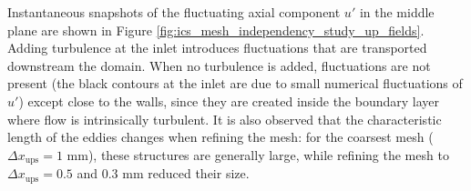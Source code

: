 Instantaneous snapshots of the fluctuating axial component $u'$ in the middle plane are shown in Figure \ref{fig:ics_mesh_independency_study_up_fields}. Adding turbulence at the inlet introduces fluctuations that are transported downstream the domain. When no turbulence is added, fluctuations are not present (the black contours at the inlet are due to small numerical fluctuations of $u'$) except close to the walls, since they are created inside the boundary layer where flow is intrinsically turbulent. It is also observed that the characteristic length of the eddies changes when refining the mesh: for the coarsest mesh ($\Delta x_\mathrm{ups} = 1$ mm), these structures are generally large, while refining the mesh to $\Delta x_\mathrm{ups} = 0.5$ and $0.3$ mm reduced their size. 

%
%
%
%
%
%
%

